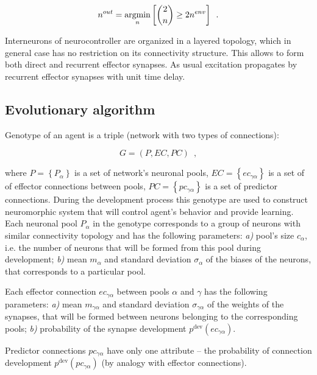 \documentclass[letterpaper]{article}
\begin{document}
\begin{equation}
	n^{out}=\underset{n}{\operatorname{argmin}} \left[\dbinom{2}{n}\geq2n^{env}\right] \enspace . 
\end{equation}   

Interneurons of neurocontroller are organized in a layered topology, which in general case has no restriction on its connectivity structure. This allows to form both direct and recurrent effector synapses. As usual excitation propagates by recurrent effector synapses with unit time delay.

\subsection{Evolutionary algorithm}

Genotype of an agent is a triple (network with two types of connections):

\begin{equation}
	G = \left( P, EC, PC\right)\enspace , 
\end{equation} 

\noindent where $P = \left\{P_{\alpha}\right\}$ is a set of network's neuronal pools, $EC = \left\{ec_{\gamma\alpha}\right\}$ is a set of of effector connections between pools, $PC = \left\{pc_{\gamma\alpha}\right\}$ is a set of predictor connections. During the development process this genotype are used to construct neuromorphic system that will control agent's behavior and provide learning. Each neuronal pool $P_{\alpha}$ in the genotype corresponds to a group of neurons with similar connectivity topology and has the following parameters: {\em a)} pool's size $c_{\alpha}$, i.e. the number of neurons that will be formed from this pool during development; {\em b)} mean $m_{\alpha}$ and standard deviation $\sigma_{\alpha}$ of the biases of the neurons, that corresponds to a particular pool.

Each effector connection $ec_{\gamma\alpha}$ between pools $\alpha$ and $\gamma$ has the following parameters:  {\em a)} mean $m_{\gamma\alpha}$ and standard deviation $\sigma_{\gamma\alpha}$ of the weights of the synapses, that will be formed between neurons belonging to the corresponding pools; {\em b)} probability of the synapse development $p^{\mathrm{dev}}\left(ec_{\gamma\alpha}\right)$.

Predictor connections $pc_{\gamma\alpha}$ have only one attribute -- the probability of connection development $p^{\mathrm{dev}}\left(pc_{\gamma\alpha}\right)$ (by analogy with effector connections).
\end{document}
